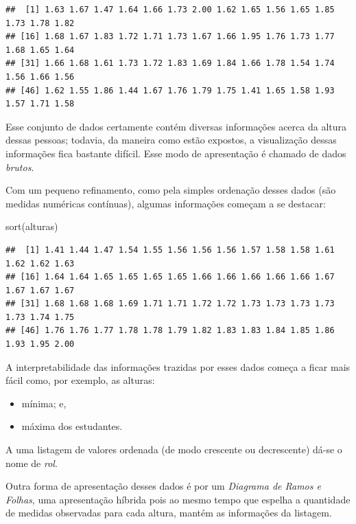 \documentclass[
]{book}
\newenvironment{Shaded}{\begin{snugshade}}{\end{snugshade}}
\newcommand{\FunctionTok}[1]{\textcolor[rgb]{0.00,0.00,0.00}{#1}}
\newcommand{\NormalTok}[1]{#1}
\providecommand{\tightlist}{%
  \setlength{\itemsep}{0pt}\setlength{\parskip}{0pt}}
\begin{document}
\begin{verbatim}
##  [1] 1.63 1.67 1.47 1.64 1.66 1.73 2.00 1.62 1.65 1.56 1.65 1.85 1.73 1.78 1.82
## [16] 1.68 1.67 1.83 1.72 1.71 1.73 1.67 1.66 1.95 1.76 1.73 1.77 1.68 1.65 1.64
## [31] 1.66 1.68 1.61 1.73 1.72 1.83 1.69 1.84 1.66 1.78 1.54 1.74 1.56 1.66 1.56
## [46] 1.62 1.55 1.86 1.44 1.67 1.76 1.79 1.75 1.41 1.65 1.58 1.93 1.57 1.71 1.58
\end{verbatim}

Esse conjunto de dados certamente contém diversas informações acerca da altura dessas pessoas; todavia, da maneira como estão expostos, a visualização dessas informações fica bastante difícil. Esse modo de apresentação é chamado de dados \emph{brutos}.

Com um pequeno refinamento, como pela simples ordenação desses dados (são medidas numéricas contínuas), algumas informações começam a se destacar:

\begin{Shaded}
\begin{Highlighting}[]
\FunctionTok{sort}\NormalTok{(alturas)}
\end{Highlighting}
\end{Shaded}

\begin{verbatim}
##  [1] 1.41 1.44 1.47 1.54 1.55 1.56 1.56 1.56 1.57 1.58 1.58 1.61 1.62 1.62 1.63
## [16] 1.64 1.64 1.65 1.65 1.65 1.65 1.66 1.66 1.66 1.66 1.66 1.67 1.67 1.67 1.67
## [31] 1.68 1.68 1.68 1.69 1.71 1.71 1.72 1.72 1.73 1.73 1.73 1.73 1.73 1.74 1.75
## [46] 1.76 1.76 1.77 1.78 1.78 1.79 1.82 1.83 1.83 1.84 1.85 1.86 1.93 1.95 2.00
\end{verbatim}

A interpretabilidade das informações trazidas por esses dados começa a ficar mais fácil como, por exemplo, as alturas:

\begin{itemize}
\tightlist
\item
  mínima; e,
\item
  máxima dos estudantes.
\end{itemize}

A uma listagem de valores ordenada (de modo crescente ou decrescente) dá-se o nome de \emph{rol}.

Outra forma de apresentação desses dados é por um \emph{Diagrama de Ramos e Folhas}, uma apresentação híbrida pois ao mesmo tempo que espelha a quantidade de medidas observadas para cada altura, mantém as informações da listagem.
\end{document}

